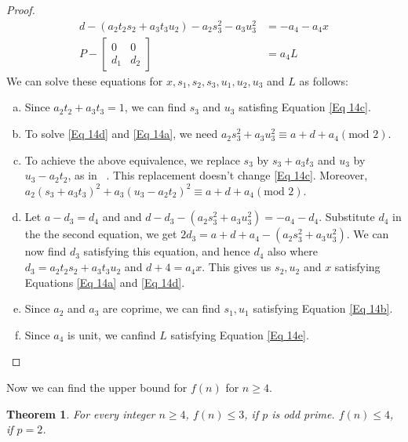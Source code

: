 \documentclass[12pt,a4paper]{article}
\newtheorem{thm}{Theorem}[section]
\begin{document}
\begin{proof}
\begin{subequations}
\begin{align}
			d- (a_2t_2s_2 + a_3t_3u_2) - a_2s_3^2 -a_3u_3^2&= -a_4-a_4x \label{Eq 14d}\\
			P - \begin{bmatrix}
				0 & 0 \\
				d_1 & d_2
			\end{bmatrix} &= a_4L \label{Eq 14e}
		\end{align}
	\end{subequations}
	We can solve these equations for $x, s_1, s_2, s_3, u_1,u_2,u_3$ and $L$ as follows:
	\begin{enumerate}[(a)]
		\item Since $a_2t_2 + a_3t_3 =1$, we can find $s_3$ and $u_3$ satisfing Equation \eqref{Eq 14c}.
		\item To solve \eqref{Eq 14d} and \eqref{Eq 14a}, we need $a_2s_3^2 + a_3u_3^2 \equiv a+d+a_4 (\mbox{mod 2})$.
		\item To achieve the above equivalence, we replace $s_3$ by $s_3 + a_3t_3$ and $u_3$ by $u_3-a_2t_2$, as in ~\cite{Koo2025}. This replacement doesn't change \eqref{Eq 14c}. Moreover, $a_2(s_3 + a_3t_3)^2 + a_3(u_3-a_2t_2)^2 \equiv a+d+a_4 (\mbox{mod 2})$.
		\item Let $a-d_3=d_4$ and and $d-d_3 - (a_2s_3^2 + a_3u_3^2) = -a_4-d_4$. Substitute $d_4$ in the the second equation, we get $2d_3 = a + d  +a_4 - (a_2s_3^2 + a_3u_3^2)$. We can now find $d_3$ satisfying this equation, and hence $d_4$ also where $d_3 = a_2t_2s_2 + a_3t_3u_2$ and $d+4=a_4x$. This gives us $s_2, u_2$ and $x$ satisfying Equations \eqref{Eq 14a} and \eqref{Eq 14d}.
		\item Since $a_2$ and $a_3$ are coprime, we can find $s_1,u_1$ satisfying Equation \eqref{Eq 14b}.
		\item Since $a_4$ is unit, we canfind $L$ satisfying Equation \eqref{Eq 14e}.
	\end{enumerate}
	\end{proof}
	Now we can find the upper bound for $f(n)$ for $n \geq 4$.
	\begin{thm}
		For every integer $n \geq 4$, $f(n) \leq 3$, if $p$ is odd prime. $f(n) \leq 4$, if $p=2$.
	\end{thm}
\end{document}
